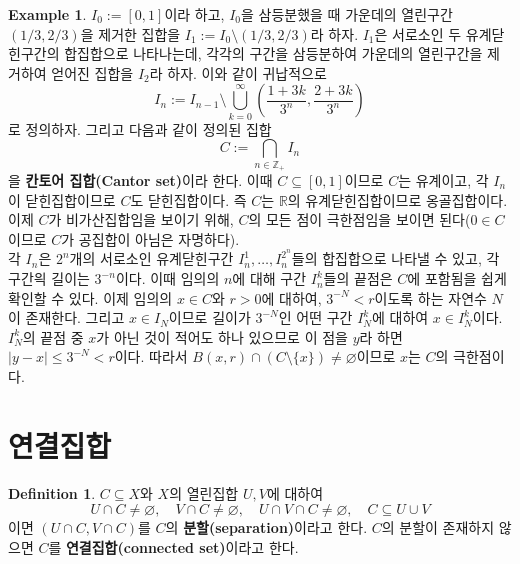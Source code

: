 \documentclass[11pt]{book}
\numberwithin{equation}{chapter}
\def\ZZ{\mathbb{Z}}
\def\RR{\mathbb{R}}
\newcommand{\abs}[1]{\left\vert#1\right\vert}
\newcommand{\paren}[1]{\left(#1\right)}
\theoremstyle{definition}
\newtheorem{defn}[thm]{Definition}
\newtheorem*{ex}{Example}
\begin{document}
\begin{ex}
    \(I_0 := [0, 1]\)이라 하고, \(I_0\)을 삼등분했을 때 가운데의 열린구간 \((1/3, 2/3)\)을 제거한 집합을 \(I_1 := I_0 \setminus (1/3, 2/3)\)라 하자. \(I_1\)은 서로소인 두 유계닫힌구간의 합집합으로 나타나는데, 각각의 구간을 삼등분하여 가운데의 열린구간을 제거하여 얻어진 집합을 \(I_2\)라 하자. 이와 같이 귀납적으로
    \[
    I_n := I_{n-1} \setminus \bigcup_{k=0}^\infty \paren{\frac{1+3k}{3^n}, \frac{2+3k}{3^n}}    
    \]
    로 정의하자. 그리고 다음과 같이 정의된 집합
    \[
    C := \bigcap_{n \in \ZZ_+} I_n
    \]
    을 \textbf{칸토어 집합(Cantor set)}이라 한다. 이때 \(C \subseteq [0, 1]\)이므로 \(C\)는 유계이고, 각 \(I_n\)이 닫힌집합이므로 \(C\)도 닫힌집합이다. 즉 \(C\)는 \(\RR\)의 유계닫힌집합이므로 옹골집합이다. 이제 \(C\)가 비가산집합임을 보이기 위해, \(C\)의 모든 점이 극한점임을 보이면 된다(\(0 \in C\)이므로 \(C\)가 공집합이 아님은 자명하다).\\
    각 \(I_n\)은 \(2^n\)개의 서로소인 유계닫힌구간 \(I_n^1, \ldots, I_n^{2^n}\)들의 합집합으로 나타낼 수 있고, 각 구간읙 길이는 \(3^{-n}\)이다. 이때 임의의 \(n\)에 대해 구간 \(I_n^k\)들의 끝점은 \(C\)에 포함됨을 쉽게 확인할 수 있다. 이제 임의의 \(x \in C\)와 \(r > 0\)에 대하여, \(3^{-N} < r\)이도록 하는 자연수 \(N\)이 존재한다. 그리고 \(x \in I_N\)이므로 길이가 \(3^{-N}\)인 어떤 구간 \(I_N^k\)에 대하여 \(x \in I_N^k\)이다. \(I_N^k\)의 끝점 중 \(x\)가 아닌 것이 적어도 하나 있으므로 이 점을 \(y\)라 하면 \(\abs{y - x} \le 3^{-N} < r\)이다. 따라서 \(B(x, r) \cap (C \setminus \{x\}) \ne \varnothing\)이므로 \(x\)는 \(C\)의 극한점이다.
\end{ex}

\section{연결집합}

\begin{defn}
    \(C \subseteq X\)와 \(X\)의 열린집합 \(U, V\)에 대하여
    \[
    U \cap C \ne \varnothing, \quad V \cap C \ne \varnothing, \quad  U \cap V \cap C \ne \varnothing , \quad C \subseteq U \cup V  
    \]
    이면 \((U \cap C, V \cap C)\)를 \(C\)의 \textbf{분할(separation)}이라고 한다. \(C\)의 분할이 존재하지 않으면 \(C\)를 \textbf{연결집합(connected set)}이라고 한다.
\end{defn}
\end{document}
